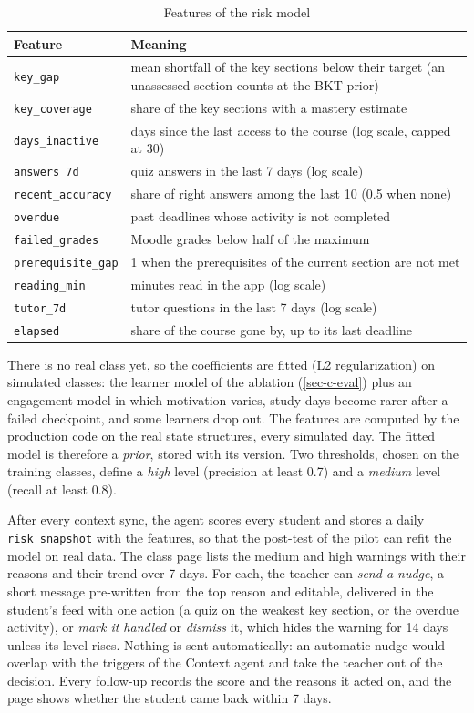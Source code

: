 \begin{table}[htbp]
\centering
\caption{Features of the risk model}
\label{tab-risk-features}
\small
\begin{tabularx}{\textwidth}{@{}L{3.2cm}Y@{}}
\toprule
\textbf{Feature} & \textbf{Meaning} \\
\midrule
\texttt{key\_gap} & mean shortfall of the key sections below their target (an unassessed section counts at the BKT prior) \\
\texttt{key\_coverage} & share of the key sections with a mastery estimate \\
\texttt{days\_inactive} & days since the last access to the course (log scale, capped at 30) \\
\texttt{answers\_7d} & quiz answers in the last 7 days (log scale) \\
\texttt{recent\_accuracy} & share of right answers among the last 10 (0.5 when none) \\
\texttt{overdue} & past deadlines whose activity is not completed \\
\texttt{failed\_grades} & Moodle grades below half of the maximum \\
\texttt{prerequisite\_gap} & 1 when the prerequisites of the current section are not met \\
\texttt{reading\_min} & minutes read in the app (log scale) \\
\texttt{tutor\_7d} & tutor questions in the last 7 days (log scale) \\
\texttt{elapsed} & share of the course gone by, up to its last deadline \\
\bottomrule
\end{tabularx}
\end{table}

There is no real class yet, so the coefficients are fitted (L2
regularization) on simulated classes: the learner model of the ablation
(\cref{sec-c-eval}) plus an engagement model in which motivation varies,
study days become rarer after a failed checkpoint, and some learners drop
out. The features are computed by the production code on the real state
structures, every simulated day. The fitted model is therefore a
\emph{prior}, stored with its version. Two thresholds, chosen on the
training classes, define a \emph{high} level (precision at least 0.7) and
a \emph{medium} level (recall at least 0.8).

After every context sync, the agent scores every student and stores a
daily \texttt{risk\_snapshot} with the features, so that the post-test of
the pilot can refit the model on real data. The class page lists the
medium and high warnings with their reasons and their trend over 7 days.
For each, the teacher can \emph{send a nudge}, a short message pre-written
from the top reason and editable, delivered in the student's feed with one
action (a quiz on the weakest key section, or the overdue activity), or
\emph{mark it handled} or \emph{dismiss} it, which hides the warning for
14 days unless its level rises. Nothing is sent automatically: an
automatic nudge would overlap with the triggers of the Context agent and
take the teacher out of the decision. Every follow-up records the score
and the reasons it acted on, and the page shows whether the student came
back within 7 days.

